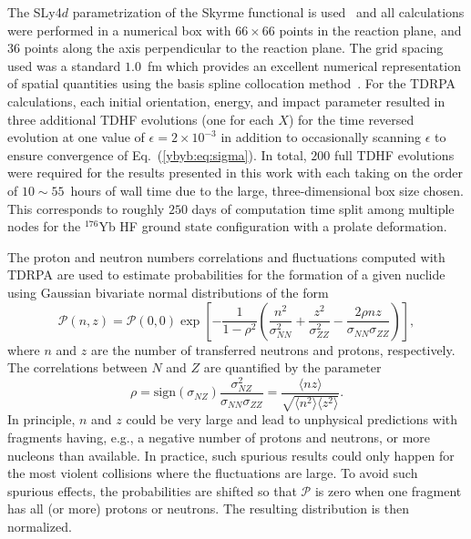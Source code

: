 The SLy4$d$ parametrization of the Skyrme functional is used~\citep{kim1997} and
all calculations were performed in a numerical box with $66 \times 66$ points in the reaction plane, and 36 points along the axis perpendicular to the reaction plane.
The grid spacing used was a standard $1.0$~fm which provides an excellent numerical representation of spatial quantities using the basis spline collocation method~\citep{umar1991a}.
For the TDRPA calculations, each initial orientation, energy, and impact parameter resulted in three additional TDHF evolutions (one for each $X$) for the time reversed evolution at one value of $\epsilon=2\times10^{-3}$ in addition to occasionally scanning $\epsilon$ to ensure convergence of Eq.~(\ref{ybyb:eq:sigma}).
In total, $200$ full TDHF evolutions were required for the results presented in this work with each taking on the order of $10\sim55$~hours of wall time due to the large, three-dimensional box size chosen.
This corresponds to roughly $250$ days of computation time split among multiple nodes for the $^{176}$Yb HF ground state configuration with a prolate deformation. 

The proton and neutron numbers correlations and fluctuations computed with TDRPA are used to estimate probabilities for the formation of a given nuclide using 
Gaussian bivariate normal distributions of the form
\begin{equation}
\mathcal{P}(n,z) = \mathcal{P}(0,0)\exp\left[ -\frac{1}{1-\rho^2} \left( \frac{n^2}{\sigma_{NN}^2}+\frac{z^2}{\sigma_{ZZ}^2} - \frac{2\rho nz}{\sigma_{NN}\sigma_{ZZ}}\right) \right], 
\label{eq:Pnz}
\end{equation}
where $n$ and $z$ are the number of transferred neutrons and protons, respectively.  
The correlations between $N$ and $Z$ are quantified by the parameter
\begin{equation}
\rho = \mbox{sign}(\sigma_{NZ})\frac{\sigma_{NZ}^2}{\sigma_{NN}\sigma_{ZZ}}=\frac{\langle nz\rangle}{\sqrt{\langle n^2\rangle\langle z^2\rangle}}.
\end{equation}
In principle, $n$ and $z$ could be very large and lead to unphysical predictions with fragments having, e.g., a negative number of protons and neutrons, or more nucleons than available. 
In practice, such spurious results could only happen for the most violent collisions where the fluctuations are large.  
To avoid such spurious effects, the probabilities are shifted so that $\mathcal{P}$ is zero when one fragment has all (or more) protons or neutrons. 
The resulting distribution is then normalized. 

